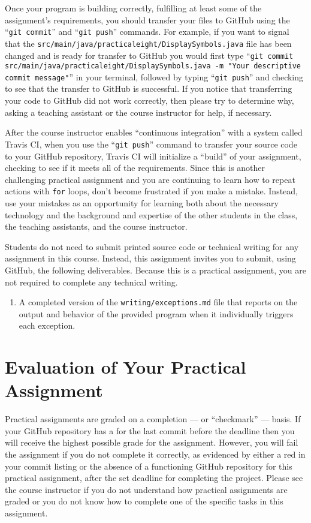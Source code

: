 \documentclass[11pt]{article}
\newcommand{\mainprogramsource}{\lstinline{src/main/java/practicaleight/DisplaySymbols.java}}
\newcommand{\gitcommit}{\command{git commit}}
\newcommand{\gitpush}{\command{git push}}
\newcommand{\gitcommitmainprogram}{\command{git commit src/main/java/practicaleight/DisplaySymbols.java -m "Your
descriptive commit message"}}
\newcommand{\command}[1]{``\lstinline{#1}''}
\newcommand{\program}[1]{\lstinline{#1}}
\newcommand{\step}[1]{``{#1}''}
\newcommand{\checkmark}{\ding{51}}
\newcommand{\naughtmark}{\ding{55}}
\begin{document}
Once your program is building correctly, fulfilling at least some of the assignment's requirements, you should transfer
your files to GitHub using the \gitcommit{} and \gitpush{} commands. For example, if you want to signal that the
\mainprogramsource{} file has been changed and is ready for transfer to GitHub you would first type
\gitcommitmainprogram{} in your terminal, followed by typing \gitpush{} and checking to see that the transfer to GitHub
is successful. If you notice that transferring your code to GitHub did not work correctly, then please try to determine
why, asking a teaching assistant or the course instructor for help, if necessary.

After the course instructor enables \step{continuous integration} with a system called Travis CI, when you use the
\gitpush{} command to transfer your source code to your GitHub repository, Travis CI will initialize a \step{build} of
your assignment, checking to see if it meets all of the requirements. Since this is another challenging practical
assignment and you are continuing to learn how to repeat actions with \program{for} loops, don't become frustrated if
you make a mistake. Instead, use your mistakes as an opportunity for learning both about the necessary technology and
the background and expertise of the other students in the class, the teaching assistants, and the course instructor.

Students do not need to submit printed source code or technical writing for any assignment in this course.
Instead, this assignment invites you to submit, using GitHub, the following deliverables. Because this is a practical
assignment, you are not required to complete any technical writing.

\begin{enumerate}

\setlength{\itemsep}{0in}

\item A completed version of the \program{writing/exceptions.md} file that reports on the output and behavior of the
  provided program when it individually triggers each exception.

\end{enumerate}

\section*{Evaluation of Your Practical Assignment}

Practical assignments are graded on a completion --- or ``checkmark'' --- basis. If your GitHub repository has a
\checkmark{} for the last commit before the deadline then you will receive the highest possible grade for the
assignment. However, you will fail the assignment if you do not complete it correctly, as evidenced by either a red
\naughtmark{} in your commit listing or the absence of a functioning GitHub repository for this practical assignment,
after the set deadline for completing the project. Please see the course instructor if you do not understand how
practical assignments are graded or you do not know how to complete one of the specific tasks in this assignment.
\end{document}
